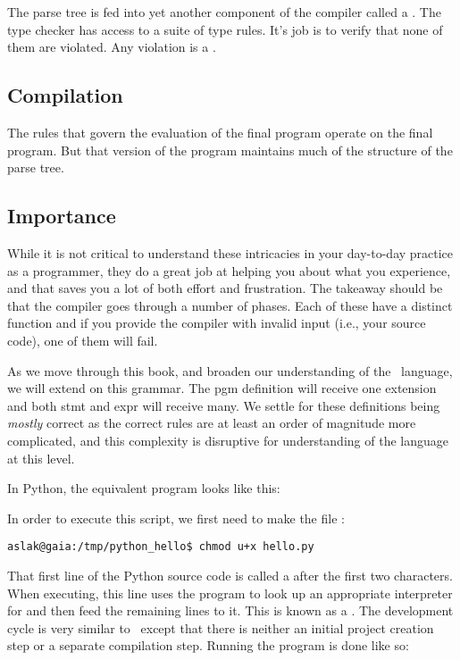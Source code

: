 The parse tree is fed into yet another component of the compiler called a . The type checker has access to a suite of type rules. It's job is to verify that none of them are violated. Any violation is a .

\subsection{Compilation}

The rules that govern the evaluation of the final program operate on the final program. But that version of the program maintains much of the structure of the parse tree.

\subsection{Importance}

While it is not critical to understand these intricacies in your day-to-day practice as a programmer, they do a great job at helping you  about what you experience, and that saves you a lot of both effort and frustration. The takeaway should be that the compiler goes through a number of phases. Each of these have a distinct function and if you provide the compiler with invalid input (i.e., your source code), one of them will fail.

As we move through this book, and broaden our understanding of the \csharp\ language, we will extend on this grammar. The pgm definition will receive one extension and both stmt and expr will receive many. We settle for these definitions being \textsl{mostly} correct as the correct rules are at least an order of magnitude more complicated, and this complexity is disruptive for understanding of the language at this level.

\label{sec:first:python}

In Python, the equivalent program looks like this:


In order to execute this script, we first need to make the file :
\begin{verbatim}
aslak@gaia:/tmp/python_hello$ chmod u+x hello.py
\end{verbatim}

That first line of the Python source code is called a  after the first two characters. When executing, this line uses the  program to look up an appropriate interpreter for  and then feed the remaining lines to it. This is known as a . The development cycle is very similar to \csharp\ except that there is neither an initial project creation step or a separate compilation step. Running the program is done like so:

